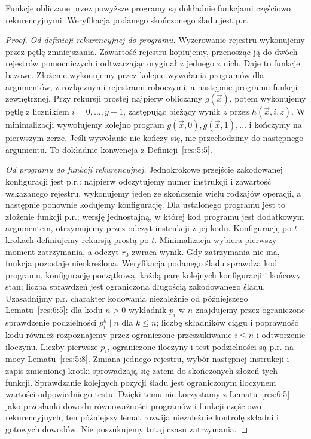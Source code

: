 \begin{lemat}\label{res:6:3}
Funkcje obliczane przez powyższe programy są dokładnie funkcjami częściowo rekurencyjnymi. Weryfikacja podanego skończonego śladu jest p.r.
\end{lemat}
\begin{proof}
\emph{Od definicji rekurencyjnej do programu.} Wyzerowanie rejestru wykonujemy przez pętlę zmniejszania. Zawartość rejestru kopiujemy, przenosząc ją do dwóch rejestrów pomocniczych i odtwarzając oryginał z jednego z nich. Daje to funkcje bazowe. Złożenie wykonujemy przez kolejne wywołania programów dla argumentów, z rozłącznymi rejestrami roboczymi, a następnie programu funkcji zewnętrznej. Przy rekursji prostej najpierw obliczamy $g(\vec x)$, potem wykonujemy pętlę z licznikiem $i=0,\ldots,y-1$, zastępując bieżący wynik $z$ przez $h(\vec x,i,z)$. W minimalizacji wywołujemy kolejno program $g(\vec x,0),g(\vec x,1),\ldots$ i kończymy na pierwszym zerze. Jeśli wywołanie nie kończy się, nie przechodzimy do następnego argumentu. To dokładnie konwencja z Definicji~\ref{res:5:5}.

\emph{Od programu do funkcji rekurencyjnej.} Jednokrokowe przejście zakodowanej konfiguracji jest p.r.: najpierw odczytujemy numer instrukcji i zawartość wskazanego rejestru, wykonujemy jeden ze skończenie wielu rodzajów operacji, a następnie ponownie kodujemy konfigurację. Dla ustalonego programu jest to złożenie funkcji p.r.; wersję jednostajną, w której kod programu jest dodatkowym argumentem, otrzymujemy przez odczyt instrukcji z jej kodu. Konfigurację po $t$ krokach definiujemy rekursją prostą po $t$. Minimalizacja wybiera pierwszy moment zatrzymania, a odczyt $r_0$ zwraca wynik. Gdy zatrzymania nie ma, funkcja pozostaje nieokreślona. Weryfikacja podanego śladu sprawdza kod programu, konfigurację początkową, każdą parę kolejnych konfiguracji i końcowy stan; liczba sprawdzeń jest ograniczona długością zakodowanego śladu. Uzasadnijmy p.r. charakter kodowania niezależnie od późniejszego Lematu~\ref{res:6:5}: dla kodu $n>0$ wykładnik $p_i$ w $n$ znajdujemy przez ograniczone sprawdzenie podzielności $p_i^k\mid n$ dla $k\le n$; liczbę składników ciągu i poprawność kodu również rozpoznajemy przez ograniczone przeszukiwanie $i\le n$ i odtworzenie iloczynu. Liczby pierwsze $p_i$, ograniczone iloczyny i test podzielności są p.r. na mocy Lematu~\ref{res:5:8}. Zmiana jednego rejestru, wybór następnej instrukcji i zapis zmienionej krotki sprowadzają się zatem do skończonych złożeń tych funkcji. Sprawdzanie kolejnych pozycji śladu jest ograniczonym iloczynem wartości odpowiedniego testu. Dzięki temu nie korzystamy z Lematu~\ref{res:6:5} jako przesłanki dowodu równoważności programów i funkcji częściowo rekurencyjnych; ten późniejszy lemat rozwija niezależnie kontrolę składni i gotowych dowodów. Nie poszukujemy tutaj czasu zatrzymania.
\end{proof}

